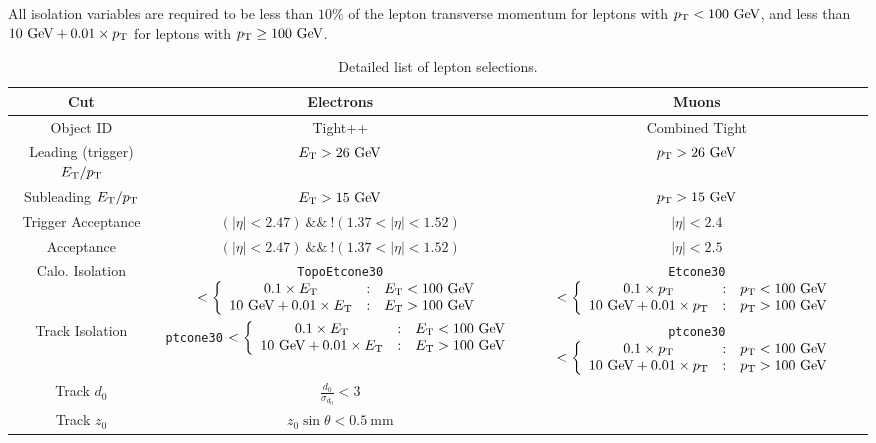 All isolation variables are required to be less than $10\%$ of the lepton transverse momentum for leptons with $p_{\text{T}}<100~\mbox{GeV}$, and less than $10~\mbox{GeV}+0.01\times p_{\text{T}}$ for leptons with $p_{\text{T}}\geq 100~\mbox{GeV}$. 

\begin{table}[h]
	\footnotesize
		\begin{tabular}{ccc}
			Cut & Electrons & Muons \\
			\hline
			Object ID & Tight++ & Combined Tight \\
			Leading (trigger) $E_{\text{T}}/p_{\text{T}}$ & $E_{\text{T}}>26~\mbox{GeV}$ & $p_{\text{T}}>26~\mbox{GeV}$ \\
			Subleading $E_{\text{T}}/p_{\text{T}}$ & $E_{\text{T}}>15~\mbox{GeV}$ & $p_{\text{T}}>15~\mbox{GeV}$ \\
			Trigger Acceptance & $(|\eta|<2.47)\ \&\&\ !(1.37<|\eta|<1.52)$ & $|\eta|<2.4$ \\
			Acceptance & $(|\eta|<2.47)\ \&\&\ !(1.37<|\eta|<1.52)$ & $|\eta|<2.5$ \\
			Calo. Isolation & \verb.TopoEtcone30. $<\left\{\begin{array}{ccl} 0.1\times E_{\text{T}} & : & E_{\text{T}} < 100~\mbox{GeV} \\ 10~\mbox{GeV}+0.01\times E_{\text{T}} & : & E_{\text{T}}>100~\mbox{GeV} \end{array}\right.$ & \verb.Etcone30. $<\left\{\begin{array}{ccl} 0.1\times p_{\text{T}} & : & p_{\text{T}} < 100~\mbox{GeV} \\ 10~\mbox{GeV}+0.01\times p_{\text{T}} & : & p_{\text{T}}>100~\mbox{GeV} \end{array}\right.$ \\
			Track Isolation & \verb.ptcone30. $<\left\{\begin{array}{ccl} 0.1\times E_{\text{T}} & : & E_{\text{T}} < 100~\mbox{GeV} \\ 10~\mbox{GeV}+0.01\times E_{\text{T}} & : & E_{\text{T}}>100~\mbox{GeV} \end{array}\right.$ & \verb.ptcone30. $<\left\{\begin{array}{ccl} 0.1\times p_{\text{T}} & : & p_{\text{T}} < 100~\mbox{GeV} \\ 10~\mbox{GeV}+0.01\times p_{\text{T}} & : & p_{\text{T}}>100~\mbox{GeV} \end{array}\right.$ \\
			Track $d_0$ & $\frac{d_0}{\sigma_{d_0}}<3$  \\
			Track $z_0$ & $z_0\sin\theta<0.5~\mbox{mm}$  \\
		\end{tabular}
	\caption{Detailed list of lepton selections.}
	\label{table:lepton-selections}
\end{table}


